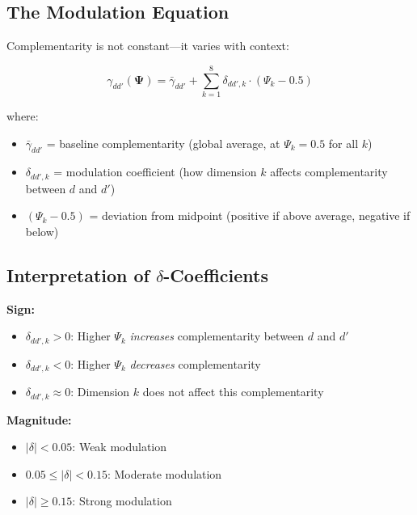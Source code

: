 \subsection{The Modulation Equation}

Complementarity is not constant---it varies with context:

\begin{equation}
\gamma_{dd'}(\boldsymbol{\Psi}) = \bar{\gamma}_{dd'} + \sum_{k=1}^{8} 
\delta_{dd',k} \cdot (\Psi_k - 0.5)
\label{eq:V-modulation}
\end{equation}

where:
\begin{itemize}[nosep]
    \item $\bar{\gamma}_{dd'}$ = baseline complementarity (global average, at $\Psi_k = 0.5$ for all $k$)
    \item $\delta_{dd',k}$ = modulation coefficient (how dimension $k$ affects complementarity between $d$ and $d'$)
    \item $(\Psi_k - 0.5)$ = deviation from midpoint (positive if above average, negative if below)
\end{itemize}

\subsection{Interpretation of $\delta$-Coefficients}

\begin{tcolorbox}[colback=blue!5!white, colframe=blue!75!black, 
    title=\textbf{Reading $\delta$-Coefficients}]

\textbf{Sign:}
\begin{itemize}[nosep]
    \item $\delta_{dd',k} > 0$: Higher $\Psi_k$ \textit{increases} complementarity between $d$ and $d'$
    \item $\delta_{dd',k} < 0$: Higher $\Psi_k$ \textit{decreases} complementarity
    \item $\delta_{dd',k} \approx 0$: Dimension $k$ does not affect this complementarity
\end{itemize}

\textbf{Magnitude:}
\begin{itemize}[nosep]
    \item $|\delta| < 0.05$: Weak modulation
    \item $0.05 \leq |\delta| < 0.15$: Moderate modulation
    \item $|\delta| \geq 0.15$: Strong modulation
\end{itemize}

\end{tcolorbox}

